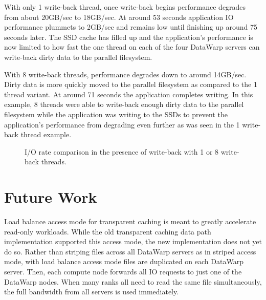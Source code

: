 \documentclass[10pt, conference, compsocconf]{IEEEtran}
\begin{document}
With only 1 write-back thread, once write-back begins performance degrades from about 20GB/sec to 18GB/sec.  At around 53 seconds application IO performance plummets to 2GB/sec and remains low until finishing up around 75 seconds later.  The SSD cache has filled up and the application's performance is now limited to how fast the one thread on each of the four DataWarp servers can write-back dirty data to the parallel filesystem.

With 8 write-back threads, performance degrades down to around 14GB/sec.  Dirty data is more quickly moved to the parallel filesystem as compared to the 1 thread variant.  At around 71 seconds the application completes writing.  In this example, 8 threads were able to write-back enough dirty data to the parallel filesystem while the application was writing to the SSDs to prevent the application's performance from degrading even further as was seen in the 1 write-back thread example.

\begin{figure}
\centering
{}
\caption{I/O rate comparison in the presence of write-back with 1 or 8 write-back threads.\label{fpp_cache_threads_compare}}
\end{figure}

\section{Future Work\label{sec_fw}}

Load balance access mode for transparent caching is meant to greatly accelerate read-only workloads.  While the old transparent caching data path implementation supported this access mode, the new implementation does not yet do so.  Rather than striping files across all DataWarp servers as in striped access mode, with load balance access mode files are duplicated on each DataWarp server.  Then, each compute node forwards all IO requests to just one of the DataWarp nodes.  When many ranks all need to read the same file simultaneously, the full bandwidth from all servers is used immediately.
\end{document}
